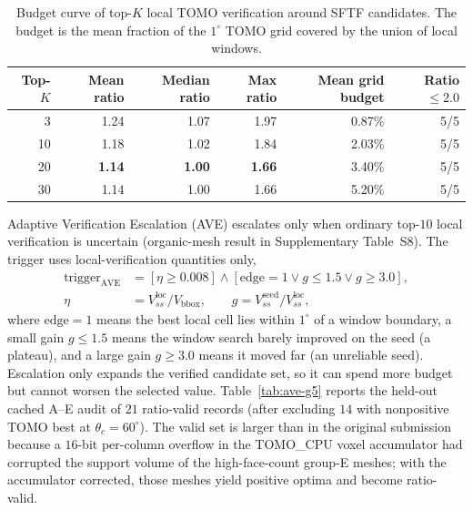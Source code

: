 \documentclass[12pt]{article}
\begin{document}
\begin{table}[H]
\centering
\caption{Budget curve of top-$K$ local TOMO verification around SFTF candidates. The
budget is the mean fraction of the $1^\circ$ TOMO grid covered by the union of local
windows.}
\label{tab:budget-curve}
\begin{tabular}{rrrrrr}
\toprule
Top-$K$ & Mean ratio & Median ratio & Max ratio & Mean grid budget & Ratio $\le 2.0$\\
\midrule
3  & 1.24 & 1.07 & 1.97 & 0.87\% & 5/5\\
10 & 1.18 & 1.02 & 1.84 & 2.03\% & 5/5\\
20 & \textbf{1.14} & \textbf{1.00} & \textbf{1.66} & 3.40\% & 5/5\\
30 & 1.14 & 1.00 & 1.66 & 5.20\% & 5/5\\
\bottomrule
\end{tabular}
\end{table}

Adaptive Verification Escalation (AVE) escalates only when ordinary top-$10$ local
verification is uncertain (organic-mesh result in Supplementary Table~S8). The trigger
uses local-verification quantities only,
\begin{equation}
\begin{aligned}
\mathrm{trigger}_{\mathrm{AVE}}
&=[\eta\ge0.008]\wedge[\mathrm{edge}=1\vee g\le1.5\vee g\ge3.0],\\
\eta&=V_{ss}^{\mathrm{loc}}/V_{\mathrm{bbox}},\qquad
 g=V_{ss}^{\mathrm{seed}}/V_{ss}^{\mathrm{loc}},
\end{aligned}
\label{eq:ave-trigger}
\end{equation}
where $\mathrm{edge}=1$ means the best local cell lies within $1^\circ$ of a window
boundary, a small gain $g\le1.5$ means the window search barely improved on the seed
(a plateau), and a large gain $g\ge3.0$ means it moved far (an unreliable seed).
Escalation only expands the verified candidate set, so it can spend more budget but
cannot worsen the selected value. Table~\ref{tab:ave-g5} reports the held-out cached
A--E audit of $21$ ratio-valid records (after excluding $14$ with nonpositive TOMO
best at $\theta_c=60^\circ$). The valid set is larger than in the original submission
because a $16$-bit per-column overflow in the TOMO\_CPU voxel accumulator had
corrupted the support volume of the high-face-count group-E meshes; with the
accumulator corrected, those meshes yield positive optima and become ratio-valid.
\end{document}
